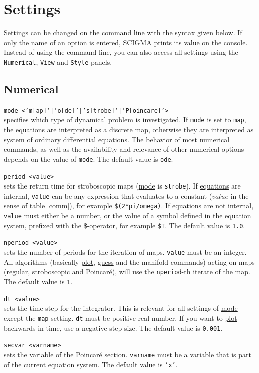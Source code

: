 \documentclass[10pt,a4paper,titlepage]{article}
\newcommand{\opt}[2]{\item{\T{\hypertarget{#1}{#1}\index[index]{#1} #2}}}
\newcommand{\HL}[1]{\hyperlink{#1}{#1}}
\newcommand{\T}[1]{\texttt{#1}}
\begin{document}
\newpage\section{Settings}
\label{sec::sett}
Settings can be changed on the command line with the syntax given below. If only the name of an option is entered, SCIGMA prints its value on the console. Instead of using the command line, you can also access all settings using the \T{Numerical}, \T{View} and \T{Style} panels.
\subsection{Numerical}
\begin{description}
\opt{mode}{<'m[ap]'|'o[de]'|'s[trobe]'|'P[oincare]'>}\\ 
specifies which type of dynamical problem is investigated. If \T{mode} is set to \T{map}, the equations are interpreted as a discrete map, otherwise they are interpreted as system of ordinary differential equations. The behavior of most numerical commands, as well as the availability and relevance of other numerical options depends on the value of \T{mode}. The default value is \T{ode}.
\opt{period}{<value>}\\
sets the return time for stroboscopic maps (\HL{mode} is \T{strobe}). If \HL{equations} are internal, \T{value} can be any expression that  evaluates to a constant ($value$ in the sense of table \ref{comm}), for example \T{\$(2*pi/omega)}. If \HL{equations} are not internal, \T{value} must either be a number, or the value of a symbol defined in the equation system, prefixed with the \$-operator, for example \T{\$T}. The default value is \T{1.0}. 
\opt{nperiod}{<value>}\\
sets the number of periods for the iteration of maps. \T{value} must be an integer. All algorithms (basically \HL{plot}, \HL{guess} and the manifold commands) acting on maps (regular, stroboscopic and Poincar\'e), will use the \T{nperiod}-th iterate of the map. The default value is \T{1}.
\opt{dt}{<value>}\\
sets the time step for the integrator. This is relevant for all settings of \HL{mode} except the \T{map} setting. \T{dt} must be positive real number. If you want to \HL{plot} backwards in time, use a negative step size. The default value is \T{0.001}. 
\opt{secvar}{<varname>}\\
sets the variable of the Poincar\'e section. \T{varname} must be a variable that is part of the current equation system. The default value is \T{'x'}.

\end{description}
\end{document}
